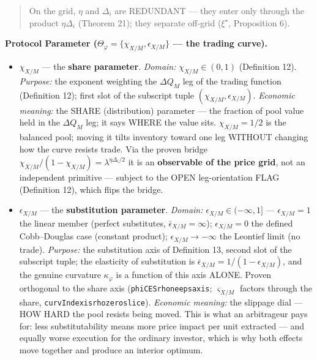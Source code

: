 \documentclass[11pt]{article}
\renewcommand{\_}{\textunderscore\allowbreak}
\begin{document}
\begin{quote}
On the grid, \(\eta\) and \(\Delta_i\) are REDUNDANT --- they enter only through the product \(\eta\Delta_i\) (Theorem 21); they separate off-grid (\(\xi^{\star}\), Proposition 6).
\end{quote}

\textbf{Protocol Parameter (\(\Theta_{\varphi} = \{\chi_{X/M}, \epsilon_{X/M}\}\) --- the trading curve).}

\begin{itemize}
\item
  \(\chi_{X/M}\) --- the \textbf{share parameter}. \emph{Domain:} \(\chi_{X/M} \in (0,1)\) (Definition 12). \emph{Purpose:} the exponent weighting the \(\Delta Q_M\) leg of the trading function (Definition 12); first slot of the subscript tuple \((\chi_{X/M}, \epsilon_{X/M})\). \emph{Economic meaning:} the SHARE (distribution) parameter --- the fraction of pool value held in the \(\Delta Q_M\) leg; it says WHERE the value sits. \(\chi_{X/M} = 1/2\) is the balanced pool; moving it tilts inventory toward one leg WITHOUT changing how the curve resists trade. Via the proven bridge \(\chi_{X/M}/(1-\chi_{X/M}) = \lambda^{\eta\Delta_i/2}\) it is an \textbf{observable of the price grid}, not an independent primitive --- subject to the OPEN leg-orientation FLAG (Definition 12), which flips the bridge.
\item
  \(\epsilon_{X/M}\) --- the \textbf{substitution parameter}. \emph{Domain:} \(\epsilon_{X/M} \in (-\infty, 1]\) --- \(\epsilon_{X/M} = 1\) the linear member (perfect substitutes, \(\bar\epsilon_{X/M} = \infty\)); \(\epsilon_{X/M} = 0\) the defined Cobb--Douglas case (constant product); \(\epsilon_{X/M} \to -\infty\) the Leontief limit (no trade). \emph{Purpose:} the substitution axis of Definition 13, second slot of the subscript tuple; the elasticity of substitution is \(\bar\epsilon_{X/M} = 1/(1-\epsilon_{X/M})\), and the genuine curvature \(\kappa_{\varphi}\) is a function of this axis ALONE. Proven orthogonal to the share axis (\texttt{phiCES\_rho\_ne\_eps\_axis}; \(\varsigma_{X/M}\) factors through the share, \texttt{curvIndex\_is\_rho\_zero\_slice}). \emph{Economic meaning:} the slippage dial --- HOW HARD the pool resists being moved. This is what an arbitrageur pays for: less substitutability means more price impact per unit extracted --- and equally worse execution for the ordinary investor, which is why both effects move together and produce an interior optimum.
\end{itemize}
\end{document}
